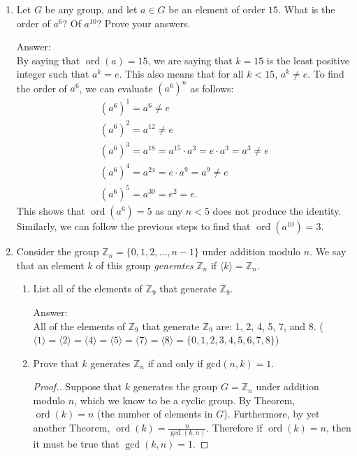 \documentclass[11pt,twoside]{article}
\DeclareMathOperator{\ord}{ord}
\begin{document}
\begin{enumerate}
\begin{enumerate}
\end{enumerate}

\item Let $G$ be any group, and let $a\in G$ be an element of order $15$.  What is the order of $a^6$?  Of $a^{10}$?  Prove your answers.

{\color{red}Answer:}\\
By saying that $\ord(a) = 15$, we are saying that $k = 15$ is the least positive integer such that $a^k = e$.  This also means that for all $k < 15$, $a^k \neq e$.  To find the order of $a^6$, we can evaluate $\left(a^6\right)^n$ as follows:
\begin{align*}
\left(a^6\right)^1 = a^6 \neq e\\
\left(a^6\right)^2 = a^{12} \neq e\\
\left(a^6\right)^3 = a^{18} = a^{15} \cdot a^3 = e \cdot a^3 = a^3 \neq e\\
\left(a^6\right)^4 = a^{24} = e \cdot a^9 = a^9 \neq e\\
\left(a^6\right)^5 = a^{30} = e^2 = e.
\end{align*}
This shows that $\ord(a^6) = 5$ as any $n < 5$ does not produce the identity.  Similarly, we can follow the previous steps to find that $\ord(a^{10}) = 3$.

\vspace{0.5cm}

\item Consider the group $\mathbb{Z}_n = \{0,1,2,\ldots, n-1\}$ under addition modulo $n$.  We say that an element $k$ of this group {\it generates} $\mathbb{Z}_n$ if $\langle k \rangle = \mathbb{Z}_n$.

\begin{enumerate}

\item List all of the elements of $\mathbb{Z}_9$ that generate $\mathbb{Z}_9$.

{\color{red}Answer:}\\
All of the elements of $\mathbb{Z}_9$ that generate $\mathbb{Z}_9$ are: 1, 2, 4, 5, 7, and 8.  ($\langle 1 \rangle = \langle 2 \rangle = \langle 4 \rangle = \langle 5 \rangle = \langle 7 \rangle = \langle 8 \rangle = \{ 0, 1, 2, 3, 4, 5, 6, 7, 8 \}$)

\vspace{0.25cm}

\item Prove that $k$ generates $\mathbb{Z}_n$ if and only if $\text{gcd}(n,k) = 1$.

\begin{proof}[\color{red}Proof.]Suppose that $k$ generates the group $G = \mathbb{Z}_n$ under addition modulo $n$, which we know to be a cyclic group.  By Theorem, $\ord(k) = n$ (the number of elements in $G$).  Furthermore, by yet another Theorem, $\ord(k) = \frac{n}{\operatorname{gcd}(k,n)}$.  Therefore if $\ord(k) = n$, then it must be true that $\operatorname{gcd}(k,n) = 1$.


\end{proof}
\end{enumerate}
\end{enumerate}
\end{document}

